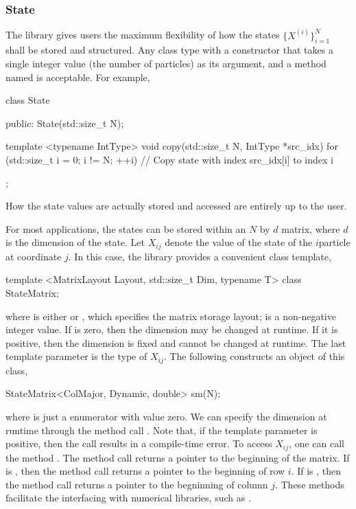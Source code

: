 \documentclass[11pt,bib,mint,hyper,altcolor]{marticle}
\begin{document}
\subsubsection{State}
\label{ssub:State}

The library gives users the maximum flexibility of how the states
$\{X^{(i)}\}_{i=1}^N$ shall be stored and structured. Any class type with a
constructor that takes a single integer value (the number of particles) as its
argument, and a method named  is acceptable. For example,
\begin{cppcode}
  class State
  {
      public:
      State(std::size_t N);

      template <typename IntType>
      void copy(std::size_t N, IntType *src_idx)
      {
          for (std::size_t i = 0; i != N; ++i) {
              // Copy state with index src_idx[i] to index i
          }
      }
  };
\end{cppcode}
How the state values are actually stored and accessed are entirely up to the
user.

For most applications, the states can be stored within an $N$ by $d$ matrix,
where $d$ is the dimension of the state. Let $X_{ij}$ denote the value of the
state of the $i$\ith particle at coordinate $j$. In this case, the library
provides a convenient class template,
\begin{cppcode}
  template <MatrixLayout Layout, std::size_t Dim, typename T>
  class StateMatrix;
\end{cppcode}
where  is either  or
, which specifies the matrix storage layout;
 is a non-negative integer value. If  is zero,
then the dimension may be changed at runtime. If it is positive, then the
dimension is fixed and cannot be changed at runtime. The last template
parameter  is the \cpp type of $X_{ij}$. The following constructs
an object of this class,
\begin{cppcode}
  StateMatrix<ColMajor, Dynamic, double> sm(N);
\end{cppcode}
where  is just a enumerator with value zero. We can specify
the dimension at runtime through the method call .
Note that, if the template parameter  is positive, then the call
results in a compile-time error. To access $X_{ij}$, one can call the method
. The method call  returns a
pointer to the beginning of the matrix. If  is
, then the method call  returns a
pointer to the beginning of row $i$. If  is
, then the method call  returns a
pointer to the begninning of column $j$. These methods facilitate the
interfacing with numerical libraries, such as \blas.
\end{document}
